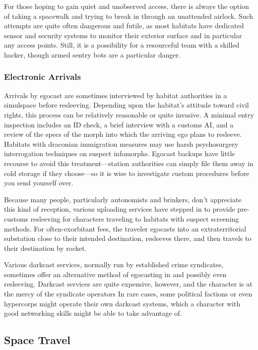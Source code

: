 For those hoping to gain quiet and unobserved 
access, there is always the option of taking a spacewalk
and trying to break in through an unattended
airlock. Such attempts are quite often dangerous and 
futile, as most habitats have dedicated sensor and 
security systems to monitor their exterior surface and 
in particular any access points. Still, it is a possibility 
for a resourceful team with a skilled hacker, though 
armed sentry bots are a particular danger.

\subsubsection{Electronic Arrivals}

Arrivals by egocast are sometimes interviewed by 
habitat authorities in a simulspace before resleeving. 
Depending upon the habitat's attitude toward civil 
rights, this process can be relatively reasonable or 
quite invasive. A minimal entry inspection includes an 
ID check, a brief interview with a customs AI, and a 
review of the specs of the morph into which the arriving
ego plans to resleeve. Habitats with draconian
immigration measures may use harsh psychosurgery 
interrogation techniques on suspect infomorphs. Egocast
backups have little recourse to avoid this treatment—station
authorities can simply file them away
in cold storage if they choose—so it is wise to investigate
custom procedures before you send yourself over.

Because many people, particularly autonomists and 
brinkers, don't appreciate this kind of reception, various
uploading services have stepped in to provide pre-customs
resleeving for characters traveling to habitats
with suspect screening methods. For often-exorbitant 
fees, the traveler egocasts into an extraterritorial substation
close to their intended destination, resleeves
there, and then travels to their destination by rocket.

Various darkcast services, normally run by established
crime syndicates, sometimes offer an alternative
method of egocasting in and possibly even resleeving. 
Darkcast services are quite expensive, however, and 
the character is at the mercy of the syndicate operators
In rare cases, some political factions or even hypercorps
might operate their own darkcast systems,
which a character with good networking skills might 
be able to take advantage of.

\subsection{Space Travel}

